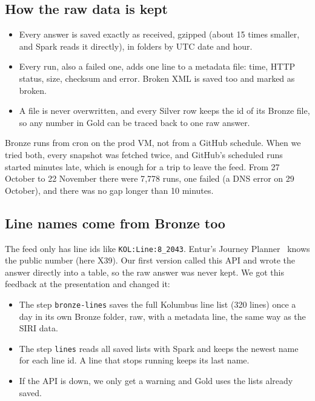 \documentclass[11pt,a4paper]{article}
\newcommand{\code}[1]{\texttt{#1}}
\begin{document}
\subsection*{How the raw data is kept}

\begin{itemize}
  \item Every answer is saved exactly as received, gzipped (about 15 times smaller, and Spark
        reads it directly), in folders by UTC date and hour.
  \item Every run, also a failed one, adds one line to a metadata file: time, HTTP status, size,
        checksum and error. Broken XML is saved too and marked as broken.
  \item A file is never overwritten, and every Silver row keeps the id of its Bronze file, so
        any number in Gold can be traced back to one raw answer.
\end{itemize}

Bronze runs from cron on the prod VM, not from a GitHub schedule. When we tried both, every
snapshot was fetched twice, and GitHub's scheduled runs started minutes late, which is enough
for a trip to leave the feed. From 27 October to 22 November there were 7{,}778 runs, one
failed (a DNS error on 29 October), and there was no gap longer than 10 minutes.

\subsection*{Line names come from Bronze too}

The feed only has line ids like \code{KOL:Line:8\_2043}. Entur's Journey Planner~\cite{jp}
knows the public number (here X39). Our first version called this API and wrote the answer
directly into a table, so the raw answer was never kept. We got this feedback at the
presentation and changed it:
\begin{itemize}
  \item The step \code{bronze-lines} saves the full Kolumbus line list (320 lines) once a day in
        its own Bronze folder, raw, with a metadata line, the same way as the SIRI data.
  \item The step \code{lines} reads all saved lists with Spark and keeps the newest name for
        each line id. A line that stops running keeps its last name.
  \item If the API is down, we only get a warning and Gold uses the lists already saved.
\end{itemize}
\end{document}
